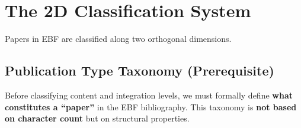 
\section{The 2D Classification System}
\label{sec:paperint-2d-system}

Papers in EBF are classified along two orthogonal dimensions.


\subsection{Publication Type Taxonomy (Prerequisite)}
\label{sec:paperint-pubtype}

Before classifying content and integration levels, we must formally define
\textbf{what constitutes a ``paper''} in the EBF bibliography. This taxonomy
is \textbf{not based on character count} but on structural properties.

